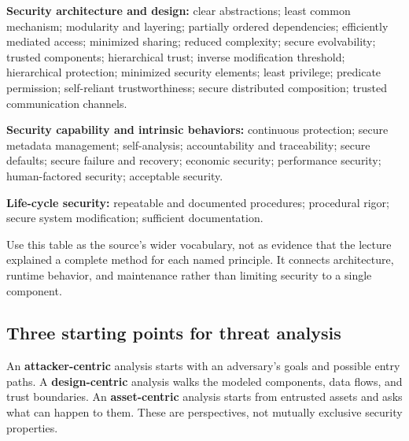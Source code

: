 \documentclass[11pt,a4paper]{article}
\numberwithin{figure}{section}
\begin{document}
\textbf{Security architecture and design:} clear abstractions; least common mechanism; modularity and layering; partially ordered dependencies; efficiently mediated access; minimized sharing; reduced complexity; secure evolvability; trusted components; hierarchical trust; inverse modification threshold; hierarchical protection; minimized security elements; least privilege; predicate permission; self-reliant trustworthiness; secure distributed composition; trusted communication channels.

\textbf{Security capability and intrinsic behaviors:} continuous protection; secure metadata management; self-analysis; accountability and traceability; secure defaults; secure failure and recovery; economic security; performance security; human-factored security; acceptable security.

\textbf{Life-cycle security:} repeatable and documented procedures; procedural rigor; secure system modification; sufficient documentation.

Use this table as the source's wider vocabulary, not as evidence that the lecture explained a complete method for each named principle. It connects architecture, runtime behavior, and maintenance rather than limiting security to a single component.

\subsection{Three starting points for threat analysis}
An \textbf{attacker-centric} analysis starts with an adversary's goals and possible entry paths. A \textbf{design-centric} analysis walks the modeled components, data flows, and trust boundaries. An \textbf{asset-centric} analysis starts from entrusted assets and asks what can happen to them. These are perspectives, not mutually exclusive security properties.
\end{document}
